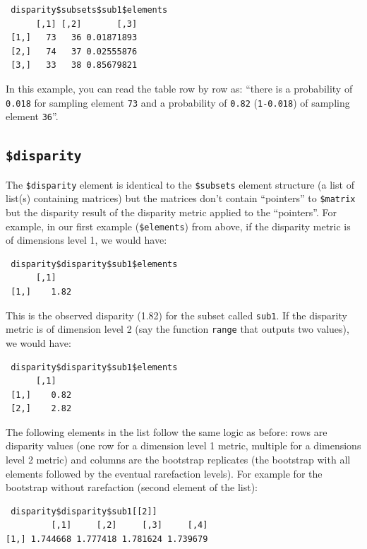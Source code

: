 \documentclass[]{book}
\begin{document}
\begin{verbatim}
 disparity$subsets$sub1$elements
      [,1] [,2]       [,3]
 [1,]   73   36 0.01871893
 [2,]   74   37 0.02555876
 [3,]   33   38 0.85679821
\end{verbatim}

In this example, you can read the table row by row as: ``there is a probability of \texttt{0.018} for sampling element \texttt{73} and a probability of \texttt{0.82} (\texttt{1-0.018}) of sampling element \texttt{36}''.

\hypertarget{disparity}{%
\subsection{\texorpdfstring{\texttt{\$disparity}}{\$disparity}}\label{disparity}}

The \texttt{\$disparity} element is identical to the \texttt{\$subsets} element structure (a list of list(s) containing matrices) but the matrices don't contain ``pointers'' to \texttt{\$matrix} but the disparity result of the disparity metric applied to the ``pointers''.
For example, in our first example (\texttt{\$elements}) from above, if the disparity metric is of dimensions level 1, we would have:

\begin{verbatim}
 disparity$disparity$sub1$elements
      [,1]
 [1,]    1.82
\end{verbatim}

This is the observed disparity (1.82) for the subset called \texttt{sub1}.
If the disparity metric is of dimension level 2 (say the function \texttt{range} that outputs two values), we would have:

\begin{verbatim}
 disparity$disparity$sub1$elements
      [,1]
 [1,]    0.82
 [2,]    2.82
\end{verbatim}

The following elements in the list follow the same logic as before: rows are disparity values (one row for a dimension level 1 metric, multiple for a dimensions level 2 metric) and columns are the bootstrap replicates (the bootstrap with all elements followed by the eventual rarefaction levels).
For example for the bootstrap without rarefaction (second element of the list):

\begin{verbatim}
 disparity$disparity$sub1[[2]]
         [,1]     [,2]     [,3]     [,4]
[1,] 1.744668 1.777418 1.781624 1.739679 
\end{verbatim}
\end{document}
